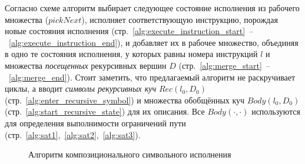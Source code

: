 Согласно схеме алгоритм выбирает следующее состояние исполнения из рабочего множества ($pickNext$), 
исполняет соответствующую инструкцию, порождая новые состояния исполнения 
(стр.~\ref{alg:execute_instruction_start}~--~\ref{alg:execute_instruction_end}), и добавляет их в рабочее множество, 
объединяя в одно те состояния исполнения, у которых равны номера инструкций $l$ и множества \emph{посещенных} рекурсивных вершин $D$
(стр.~\ref{alg:merge_start}~--~\ref{alg:merge_end}).
Стоит заметить, что предлагаемый алгоритм не раскручивает циклы, 
а вводит \emph{символы рекурсивных куч} $Rec(l_0, D_0)$ (стр.~\ref{alg:enter_recursive_symbol})
и множества обобщённых куч $Body(l_0,D_0)$ (стр.~\ref{alg:start_recursive_state}) для их описания.
Все $Body(\cdot,\cdot)$ используются для определения выполнимости ограничений пути 
(стр.~\ref{alg:sat1},~\ref{alg:sat2},~\ref{alg:sat3}).

\begin{figure}
\begin{algorithm2e}[H]
    \caption{Алгоритм композиционального символьного исполнения}
    \label{algorithm:exec}
    \small
    \setcounter{AlgoLine}{0}
    \SetAlgoSkip{}
    \;
    \Return {}\;\label{alg:start_vertex}
\end{algorithm2e}
\end{figure}

